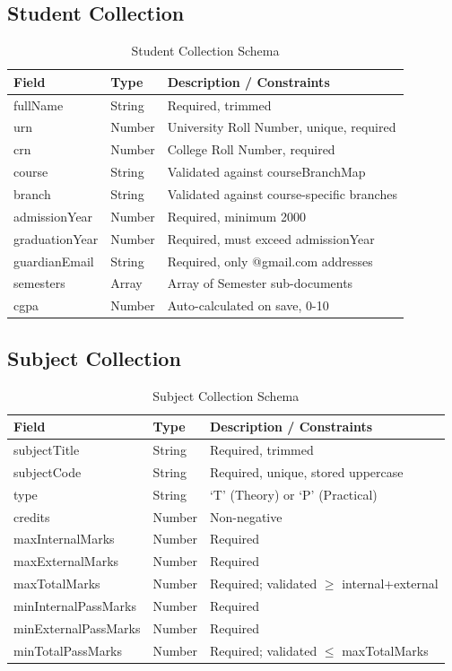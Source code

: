 \documentclass[12pt,a4paper]{report}
\begin{document}
\subsection{Student Collection}
\begin{table}[H]
\centering
\caption{Student Collection Schema}
\renewcommand{\arraystretch}{1.3}
\begin{tabular}{|l|l|p{7cm}|}
\hline
\textbf{Field} & \textbf{Type} & \textbf{Description / Constraints}\\
\hline
fullName & String & Required, trimmed\\
\hline
urn & Number & University Roll Number, unique, required\\
\hline
crn & Number & College Roll Number, required\\
\hline
course & String & Validated against courseBranchMap\\
\hline
branch & String & Validated against course-specific branches\\
\hline
admissionYear & Number & Required, minimum 2000\\
\hline
graduationYear & Number & Required, must exceed admissionYear\\
\hline
guardianEmail & String & Required, only @gmail.com addresses\\
\hline
semesters & Array & Array of Semester sub-documents\\
\hline
cgpa & Number & Auto-calculated on save, 0-10\\
\hline
\end{tabular}
\end{table}

\subsection{Subject Collection}
\begin{table}[H]
\centering
\caption{Subject Collection Schema}
\renewcommand{\arraystretch}{1.3}
\begin{tabular}{|l|l|p{7cm}|}
\hline
\textbf{Field} & \textbf{Type} & \textbf{Description / Constraints}\\
\hline
subjectTitle & String & Required, trimmed\\
\hline
subjectCode & String & Required, unique, stored uppercase\\
\hline
type & String & `T' (Theory) or `P' (Practical)\\
\hline
credits & Number & Non-negative\\
\hline
maxInternalMarks & Number & Required\\
\hline
maxExternalMarks & Number & Required\\
\hline
maxTotalMarks & Number & Required; validated $\geq$ internal+external\\
\hline
minInternalPassMarks & Number & Required\\
\hline
minExternalPassMarks & Number & Required\\
\hline
minTotalPassMarks & Number & Required; validated $\leq$ maxTotalMarks\\
\hline
\end{tabular}
\end{table}
\end{document}
